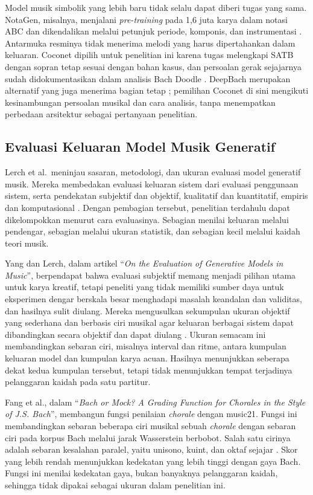 Model musik simbolik yang lebih baru tidak selalu dapat diberi tugas yang sama. NotaGen, misalnya, menjalani \textit{pre-training} pada 1,6 juta karya dalam notasi ABC dan dikendalikan melalui petunjuk periode, komponis, dan instrumentasi \parencite{wang2025}. Antarmuka resminya tidak menerima melodi yang harus dipertahankan dalam keluaran. Coconet dipilih untuk penelitian ini karena tugas melengkapi SATB dengan sopran tetap sesuai dengan bahan kasus, dan persoalan gerak sejajarnya sudah didokumentasikan dalam analisis Bach Doodle \parencite[798]{huang2019}. DeepBach merupakan alternatif yang juga menerima bagian tetap \parencite[1365]{hadjeres2017}; pemilihan Coconet di sini mengikuti kesinambungan persoalan musikal dan cara analisis, tanpa menempatkan perbedaan arsitektur sebagai pertanyaan penelitian.

\subsection{Evaluasi Keluaran Model Musik Generatif}\label{sec:evaluasi-keluaran-model}

Lerch et al.\ meninjau sasaran, metodologi, dan ukuran evaluasi model generatif musik. Mereka membedakan evaluasi keluaran sistem dari evaluasi penggunaan sistem, serta pendekatan subjektif dan objektif, kualitatif dan kuantitatif, empiris dan komputasional \parencite{lerch2025}. Dengan pembagian tersebut, penelitian terdahulu dapat dikelompokkan menurut cara evaluasinya. Sebagian menilai keluaran melalui pendengar, sebagian melalui ukuran statistik, dan sebagian kecil melalui kaidah teori musik.

Yang dan Lerch, dalam artikel ``\textit{On the Evaluation of Generative Models in Music}'', berpendapat bahwa evaluasi subjektif memang menjadi pilihan utama untuk karya kreatif, tetapi peneliti yang tidak memiliki sumber daya untuk eksperimen dengar berskala besar menghadapi masalah keandalan dan validitas, dan hasilnya sulit diulang. Mereka mengusulkan sekumpulan ukuran objektif yang sederhana dan berbasis ciri musikal agar keluaran berbagai sistem dapat dibandingkan secara objektif dan dapat diulang \parencite{yang2020}. Ukuran semacam ini membandingkan sebaran ciri, misalnya interval dan ritme, antara kumpulan keluaran model dan kumpulan karya acuan. Hasilnya menunjukkan seberapa dekat kedua kumpulan tersebut, tetapi tidak menunjukkan tempat terjadinya pelanggaran kaidah pada satu partitur.

Fang et al., dalam ``\textit{Bach or Mock? A Grading Function for Chorales in the Style of J.S. Bach}'', membangun fungsi penilaian \textit{chorale} dengan music21. Fungsi ini membandingkan sebaran beberapa ciri musikal sebuah \textit{chorale} dengan sebaran ciri pada korpus Bach melalui jarak Wasserstein berbobot. Salah satu cirinya adalah sebaran kesalahan paralel, yaitu unisono, kuint, dan oktaf sejajar \parencite{fang2020}. Skor yang lebih rendah menunjukkan kedekatan yang lebih tinggi dengan gaya Bach. Fungsi ini menilai kedekatan gaya, bukan banyaknya pelanggaran kaidah, sehingga tidak dipakai sebagai ukuran dalam penelitian ini.

